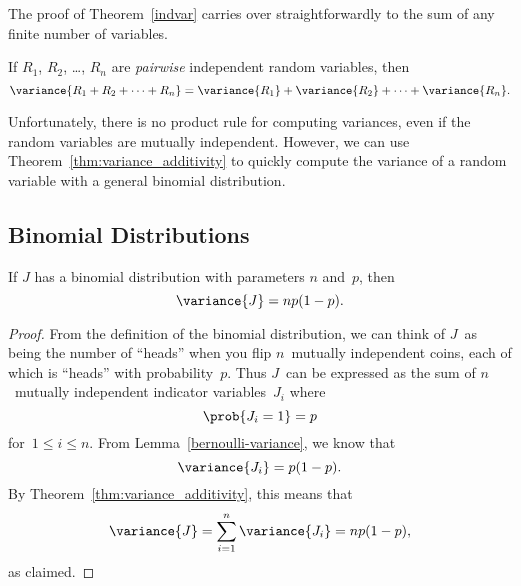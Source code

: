 The proof of Theorem~\ref{indvar} carries over straightforwardly to
the sum of any finite number of variables.

\begin{theorem}
\label{thm:variance_additivity}
If $R_1$, $R_2$, \dots, $R_n$ are \emph{pairwise} independent random
variables, then
\begin{equation}\label{vsum}
\variance{R_1 + R_2 + \cdots + R_n} = \variance{R_1} + \variance{R_2} +
  \cdots + \variance{R_n}.
\end{equation}
\end{theorem}

Unfortunately, there is no product rule for computing variances, even
if the random variables are mutually independent.  However, we can use
Theorem~\ref{thm:variance_additivity} to quickly compute the variance
of a random variable with a general binomial distribution.

\subsection{Binomial Distributions}

\begin{lemma}
\label{lem:binomial_variance}
If $J$ has a binomial distribution with parameters $n$ and~$p$, then
\begin{equation}\label{p1p}
\variance{J} = n p (1-p).
\end{equation}
\end{lemma}

\begin{proof}

From the definition of the binomial distribution, we can think of
$J$~as being the number of ``heads'' when you flip $n$~mutually
independent coins, each of which is ``heads'' with probability~$p$.
Thus $J$~can be expressed as the sum of $n$~mutually independent
indicator variables~$J_i$ where
\begin{equation*}
    \prob{J_i = 1} = p
\end{equation*}
for~$1 \le i \le n$.  From Lemma~\ref{bernoulli-variance}, we know
that
\begin{equation*}
    \variance{J_i} = p (1 - p).
\end{equation*}
By Theorem~\ref{thm:variance_additivity}, this means that
\begin{equation*}
\variance{J}
    = \sum_{i = 1}^n \variance{J_i}
    = n p (1 - p),
\end{equation*}
as claimed.
\end{proof}

